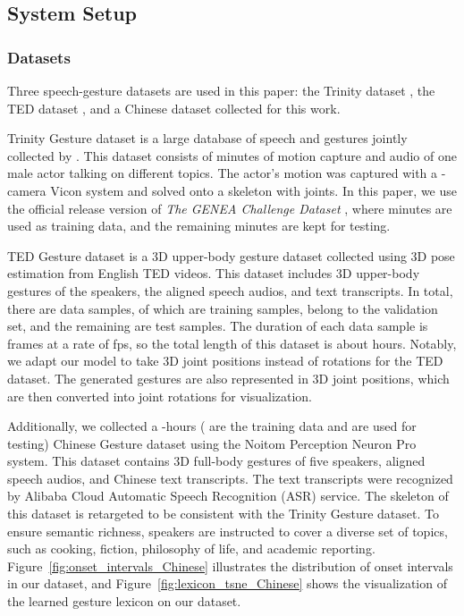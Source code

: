 \documentclass[acmtog,authorversion]{acmart}
\newcommand{\fig}{Figure{}~}
\begin{document}
\subsection{System Setup}
\label{subsec:system_setup}
\subsubsection{Datasets}
\label{subsubsection:datasets}
Three speech-gesture datasets are used in this paper: the Trinity dataset \cite{ferstl2018investigating}, the TED dataset \cite{yoon2019robots}, and a Chinese dataset collected for this work.

Trinity Gesture dataset is a large database of speech and gestures jointly collected by \citet{ferstl2018investigating}. This dataset consists of  minutes of motion capture and audio of one male actor talking on different topics. The actor’s motion was captured with a -camera Vicon system and solved onto a skeleton with  joints. In this paper, we use the official release version of \emph{The GENEA Challenge  Dataset} \cite{kucherenko2021large}, where  minutes are used as training data, and the remaining  minutes are kept for testing.

TED Gesture dataset \cite{yoon2019robots} is a 3D upper-body gesture dataset collected using 3D pose estimation from English TED videos. This dataset includes 3D upper-body gestures of the speakers, the aligned speech audios, and text transcripts. In total, there are  data samples,  of which are training samples,  belong to the validation set, and the remaining  are test samples. The duration of each data sample is  frames at a rate of  fps, so the total length of this dataset is about  hours. Notably, we adapt our model to take 3D joint positions instead of rotations for the TED dataset. The generated gestures are also represented in 3D joint positions, which are then converted into joint rotations for visualization.

Additionally, we collected a -hours ( are the training data and  are used for testing) Chinese Gesture dataset using the Noitom Perception Neuron Pro system. This dataset contains 3D full-body gestures of five speakers, aligned speech audios, and Chinese text transcripts. The text transcripts were recognized by Alibaba Cloud Automatic Speech Recognition (ASR) service. The skeleton of this dataset is retargeted to be consistent with the Trinity Gesture dataset. To ensure semantic richness, speakers are instructed to cover a diverse set of topics, such as cooking, fiction, philosophy of life, and academic reporting. \fig\ref{fig:onset_intervals_Chinese} illustrates the distribution of onset intervals in our dataset, and \fig\ref{fig:lexicon_tsne_Chinese} shows the visualization of the learned gesture lexicon on our dataset.
\end{document}
